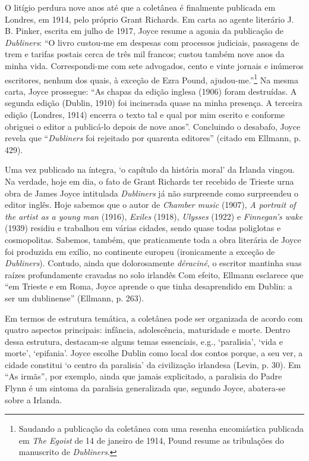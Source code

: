 O litígio perdura nove anos até que a coletânea é finalmente publicada
em Londres, em 1914, pelo próprio Grant Richards. Em carta ao agente
literário J. B. Pinker, escrita em julho de 1917, Joyce resume a
agonia da publicação de \textit{Dubliners}: ``O livro custou-me em
despesas com processos judiciais, passagens de trem e tarifas postais
cerca de três mil francos; custou também nove anos da minha vida.
Correspondi-me com sete advogados, cento e vinte jornais e inúmeros
escritores, nenhum dos quais, à exceção de Ezra Pound,
ajudou-me.''\footnote{ Saudando a publicação da coletânea com uma
resenha encomiástica publicada em \textit{The Egoist} de 14 de janeiro de 1914,
Pound resume as tribulações do manuscrito de \textit{Dubliners}.} Na
mesma carta, Joyce prossegue: ``As chapas da edição inglesa (1906)
foram destruídas. A segunda edição (Dublin, 1910) foi incinerada quase
na minha presença. A terceira edição (Londres, 1914) encerra o texto
tal e qual por mim escrito e conforme obriguei o editor a publicá-lo
depois de nove anos''. Concluindo o desabafo, Joyce revela que
``\textit{Dubliners} foi rejeitado por quarenta editores'' (citado em Ellmann,
p. 429).

Uma vez publicado na íntegra, `o capítulo da história moral' da
Irlanda vingou. Na verdade, hoje em dia, o fato de Grant Richards ter
recebido de Trieste urna obra de James Joyce intitulada \textit{Dubliners} já
não surpreende como surpreendeu o editor inglês. Hoje sabemos que o
autor de \textit{Chamber music} (1907), \textit{A portrait of the
artist as a young man} (1916), \textit{Exiles} (1918),
\textit{Ulysses} (1922) e \textit{Finnegan's wake} (1939)
residiu e trabalhou em várias cidades, sendo quase todas poliglotas e
cosmopolitas. Sabemos, também, que praticamente toda a obra literária
de Joyce foi produzida em exílio, no continente europeu (ironicamente
a exceção de \textit{Dubliners}). Contudo, ainda que dolorosamente \textit{déraciné}, o
escritor mantinha suas raízes profundamente cravadas no solo irlandês
Com efeito, Ellmann esclarece que ``em Trieste e em Roma, Joyce
aprende o que tinha desaprendido em Dublin: a ser um dublinense''
(Ellmann, p. 263).

Em termos de estrutura temática, a coletânea pode ser organizada de
acordo com quatro aspectos principais: infância, adolescência,
maturidade e morte. Dentro dessa estrutura, destacam-se alguns temas
essenciais, e.g., `paralisia', `vida e morte', `epifania'.
Joyce escolhe Dublin como local dos contos porque, a seu ver, a cidade
constitui `o centro da paralisia' da civilização irlandesa (Levin,
p. 30). Em ``As irmãs'', por exemplo, ainda que jamais
explicitado, a paralisia do Padre Flynn é um sintoma da paralisia
generalizada que, segundo Joyce, abatera-se sobre a Irlanda.

